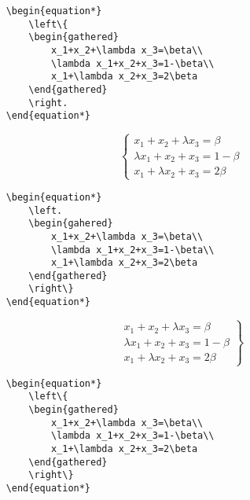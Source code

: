 \documentclass[12pt]{book}
\numberwithin{equation}{section}
\theoremstyle{plain}  %
\begin{document}
\begin{verbatim}
	\begin{equation*}
		\left\{
		\begin{gathered}
			x_1+x_2+\lambda x_3=\beta\\
			\lambda x_1+x_2+x_3=1-\beta\\
			x_1+\lambda x_2+x_3=2\beta
		\end{gathered}
		\right.
	\end{equation*}
\end{verbatim}

\begin{equation*}
	\left\{
	\begin{gathered}
		x_1+x_2+\lambda x_3=\beta\\
		\lambda x_1+x_2+x_3=1-\beta\\
		x_1+\lambda x_2+x_3=2\beta
	\end{gathered}
	\right.
\end{equation*}


\begin{verbatim}
	\begin{equation*}
		\left.
		\begin{gahered}
			x_1+x_2+\lambda x_3=\beta\\
			\lambda x_1+x_2+x_3=1-\beta\\
			x_1+\lambda x_2+x_3=2\beta
		\end{gathered}
		\right\}
	\end{equation*}
\end{verbatim}

\begin{equation*}
	\left.
	\begin{gathered}
		x_1+x_2+\lambda x_3=\beta\\
		\lambda x_1+x_2+x_3=1-\beta\\
		x_1+\lambda x_2+x_3=2\beta
	\end{gathered}
	\right\}
\end{equation*}


\begin{verbatim}
	\begin{equation*}
		\left\{
		\begin{gathered}
			x_1+x_2+\lambda x_3=\beta\\
			\lambda x_1+x_2+x_3=1-\beta\\
			x_1+\lambda x_2+x_3=2\beta
		\end{gathered}
		\right\}
	\end{equation*}
\end{verbatim}
\end{document}
